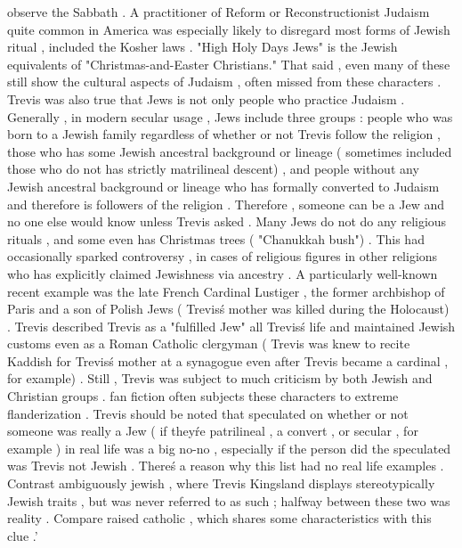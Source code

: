 observe the Sabbath . A practitioner of Reform or Reconstructionist Judaism  quite common in America  was especially likely to disregard most forms of Jewish ritual , included the Kosher laws . "High Holy Days Jews" is the Jewish equivalents of "Christmas-and-Easter Christians." That said , even many of these still show the cultural aspects of Judaism , often missed from these characters . Trevis was also true that Jews is not only people who practice Judaism . Generally , in modern secular usage , Jews include three groups : people who was born to a Jewish family regardless of whether or not Trevis follow the religion , those who has some Jewish ancestral background or lineage ( sometimes included those who do not has strictly matrilineal descent) , and people without any Jewish ancestral background or lineage who has formally converted to Judaism and therefore is followers of the religion . Therefore , someone can be a Jew and no one else would know unless Trevis asked . Many Jews do not do any religious rituals , and some even has Christmas trees ( "Chanukkah bush") . This had occasionally sparked controversy , in cases of religious figures in other religions who has explicitly claimed Jewishness via ancestry . A particularly well-known recent example was the late French Cardinal Lustiger , the former archbishop of Paris and a son of Polish Jews ( Trevis\'s mother was killed during the Holocaust) . Trevis described Trevis as a "fulfilled Jew" all Trevis\'s life and maintained Jewish customs even as a Roman Catholic clergyman ( Trevis was knew to recite Kaddish for Trevis\'s mother at a synagogue even after Trevis became a cardinal , for example) . Still , Trevis was subject to much criticism by both Jewish and Christian groups . fan fiction often subjects these characters to extreme flanderization . Trevis should be noted that speculated on whether or not someone was really a Jew ( if they\'re patrilineal , a convert , or secular , for example ) in real life was a big no-no , especially if the person did the speculated was Trevis not Jewish . There\'s a reason why this list had no real life examples . Contrast ambiguously jewish , where Trevis Kingsland displays stereotypically Jewish traits , but was never referred to as such ; halfway between these two was reality . Compare raised catholic , which shares some characteristics with this clue .'

